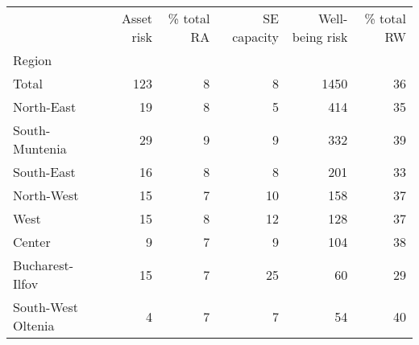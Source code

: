 \begin{tabular}{lrrrrr}
\toprule
{} &  Asset risk &  \% total RA &  SE capacity &  Well-being risk &  \% total RW \\
Region             &             &             &              &                  &             \\
\midrule
Total              &         123 &           8 &            8 &             1450 &          36 \\
North-East         &          19 &           8 &            5 &              414 &          35 \\
South-Muntenia     &          29 &           9 &            9 &              332 &          39 \\
South-East         &          16 &           8 &            8 &              201 &          33 \\
North-West         &          15 &           7 &           10 &              158 &          37 \\
West               &          15 &           8 &           12 &              128 &          37 \\
Center             &           9 &           7 &            9 &              104 &          38 \\
Bucharest-Ilfov    &          15 &           7 &           25 &               60 &          29 \\
South-West Oltenia &           4 &           7 &            7 &               54 &          40 \\
\bottomrule
\end{tabular}
